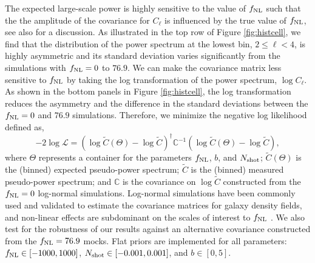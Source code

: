 The expected large-scale power is highly sensitive to the value of $f_{\rm NL}$ such that the the amplitude of the covariance for $C_{\ell}$ is influenced by the true value of $f_{\rm NL}$, see also \cite{2013MNRAS.428.1116R} for a discussion. As illustrated in the top row of Figure \ref{fig:histcell}, we find that the distribution of the power spectrum at the lowest bin, $2\leq \ell < 4$, is highly asymmetric and its standard deviation varies significantly from the simulations with $f_{\rm NL}=0$ to $76.9$. We can make the covariance matrix less sensitive to $f_{\rm NL}$ by taking the log transformation of the power spectrum, $\log C_{\ell}$. As shown in the bottom panels in Figure \ref{fig:histcell}, the log transformation reduces the asymmetry and the difference in the standard deviations between the $f_{\rm NL}=0$ and $76.9$ simulations. Therefore, we minimize the negative log likelihood defined as,
\begin{equation}\label{eq:likelihood}
-2\log \mathcal{L} = (\log \tilde{C}(\Theta)-\log \tilde{C})^{\dagger} \mathbb{C}^{-1} (\log \tilde{C}(\Theta)-\log \tilde{C}),
\end{equation}
where $\Theta$ represents a container for the parameters $f_{\rm NL}$, $b$, and $N_{\rm shot}$; $\tilde{C}(\Theta)$ is the (binned) expected pseudo-power spectrum; $\tilde{C}$ is the (binned) measured pseudo-power spectrum; and $\mathbb{C}$ is the covariance on $\log\tilde{C}$ constructed from the $f_{\rm NL}=0$ log-normal simulations. Log-normal simulations have been commonly used and validated to estimate the covariance matrices for galaxy density fields, and non-linear effects are subdominant on the scales of interest to $f_{\rm NL}$ \citep[see, e.g.,][]{2017MNRAS.466.1444C, 2021MNRAS.508.3125F}. We also test for the robustness of our results against an alternative covariance constructed from the $f_{\rm NL}=76.9$ mocks. Flat priors are implemented for all parameters: $f_{\rm NL} \in [-1000, 1000]$, $N_{\rm shot} \in [-0.001, 0.001]$, and $b \in [0, 5]$. 





